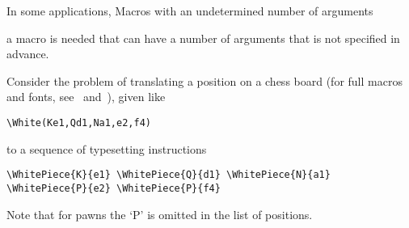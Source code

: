 In some applications,
\howto  Macros with an undetermined number
of arguments\par
a macro is needed that can have a
number of arguments that is not specified in advance.

Consider the problem of translating a position on a chess board
(for full macros and fonts, see~\cite{chess} and~\cite{Tut}),
given like
\begin{verbatim}
\White(Ke1,Qd1,Na1,e2,f4)
\end{verbatim} 
to a sequence of typesetting instructions
\begin{verbatim}
\WhitePiece{K}{e1} \WhitePiece{Q}{d1} \WhitePiece{N}{a1} 
\WhitePiece{P}{e2} \WhitePiece{P}{f4}
\end{verbatim}
Note that for pawns the `P' is omitted in the list of positions.

